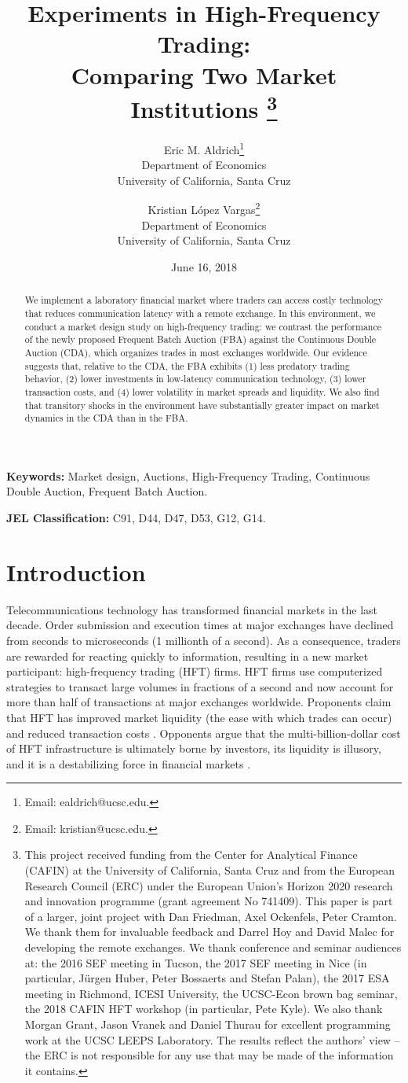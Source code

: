 \documentclass[12pt]{article}
\title{{\bf Experiments in High-Frequency Trading: \\ Comparing Two Market Institutions}
\thanks{This project received funding from the Center for Analytical Finance (CAFIN) at the University of California, Santa Cruz and from the European Research Council (ERC) under the European Union's Horizon 2020 research and innovation programme (grant agreement No 741409). 
This paper is part of a larger, joint project with Dan Friedman, Axel Ockenfels, Peter Cramton. We thank them for invaluable feedback and Darrel Hoy and David Malec for developing the remote exchanges. 
We thank conference and seminar audiences at: the 2016 SEF meeting in Tucson, the 2017 SEF meeting in Nice (in particular, J{\"u}rgen Huber, Peter Bossaerts and Stefan Palan), the 2017 ESA meeting in Richmond, ICESI University, the UCSC-Econ brown bag seminar, the 2018 CAFIN HFT workshop (in particular, Pete Kyle). 
We also thank  Morgan Grant, Jason Vranek and Daniel Thurau for excellent programming work at the UCSC LEEPS Laboratory.
The results reflect the authors' view -- the ERC is not responsible for any use that may be made of the information it contains.}}
\author{
  Eric M. Aldrich\thanks{
  Email: ealdrich@ucsc.edu.} \\
  \normalsize{Department of Economics} \\
  \normalsize{University of California, Santa Cruz}
\and
  Kristian López Vargas\thanks{
  Email: kristian@ucsc.edu.} \\
  \normalsize{Department of Economics} \\
  \normalsize{University of California, Santa Cruz}
}
\begin{document}
\renewcommand{\baselinestretch}{1}

\date{June 16, 2018}

\maketitle

\vspace{-.25in}

\begin{abstract}
We implement a laboratory financial market where traders can access costly technology that reduces communication latency with a remote exchange. In this environment, we conduct a market design study on high-frequency trading: we contrast the performance of the newly proposed Frequent Batch Auction (FBA) against the Continuous Double Auction (CDA), which organizes trades in most exchanges worldwide. Our evidence suggests that, relative to the CDA, the FBA exhibits (1) less predatory trading behavior, (2) lower investments in low-latency communication technology, (3) lower transaction costs, and (4) lower volatility in market spreads and liquidity. We also find that transitory shocks in the environment have substantially greater impact on market dynamics in the CDA than in the FBA.
\end{abstract}

\noindent \textbf{Keywords:} Market design, Auctions, High-Frequency Trading, Continuous Double Auction, Frequent Batch Auction.

\noindent \textbf{JEL Classification:} C91, D44, D47, D53, G12, G14.\\

\renewcommand{\baselinestretch}{2}

\newpage

\section{Introduction \label{Intro}}

Telecommunications technology has transformed financial markets in the last decade. Order submission and execution times at major exchanges have declined from seconds to microseconds (1 millionth of a second). As a consequence, traders are rewarded for reacting quickly to information, resulting in a new market participant: high-frequency trading (HFT) firms. HFT firms use computerized strategies to transact large volumes in fractions of a second and now account for more than half of transactions at major exchanges worldwide. 
Proponents claim that HFT has improved market liquidity (the ease with which trades can occur) and reduced transaction costs \citep{Narang2010}. Opponents argue that the multi-billion-dollar cost of HFT infrastructure is ultimately borne by investors, its liquidity is illusory, and it is a destabilizing force in financial markets \citep{Lewis2015}. 
\end{document}
